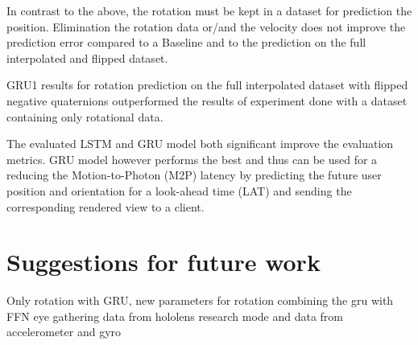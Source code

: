 In contrast to the above, the rotation must be kept in a dataset for prediction the position. Elimination the rotation data or/and the velocity does not improve the prediction error compared to a Baseline and to the prediction on the full interpolated and flipped dataset.  

GRU1 results for rotation prediction on the full interpolated dataset with flipped negative quaternions outperformed the results of experiment done with a dataset containing only rotational data. 

The evaluated LSTM and GRU model both significant improve the evaluation metrics. GRU model however performs the best and thus can be used for a reducing the Motion-to-Photon (M2P) latency by predicting the future user position and orientation for a look-ahead time (LAT) and sending the corresponding rendered view to a client. 

\section{Suggestions for future work}
\label{sec:conclusion:future}

Only rotation with GRU, new parameters for rotation
combining the gru with FFN
eye gathering data from hololens
research mode and data from accelerometer and gyro


